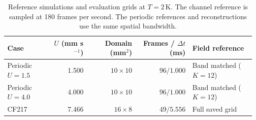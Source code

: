\begin{table}[tbp]
\centering
\caption{Reference simulations and evaluation grids at \(T=2\,\mathrm K\). The channel reference is sampled at 180 frames per second. The periodic references and reconstructions use the same spatial bandwidth.}
\label{tab:latest-simulation-reference}
\begin{tabular}{@{}lrrrl@{}}
\toprule
Case & $U$ (mm s$^{-1}$) & Domain (mm$^2$) & Frames / $\Delta t$ (ms) & Field reference \\
\midrule
Periodic $U=1.5$ & 1.500 & $10\times10$ & $96/1.000$ & Band matched ($K=12$) \\
Periodic $U=4.0$ & 4.000 & $10\times10$ & $96/1.000$ & Band matched ($K=12$) \\
CF217 & 7.466 & $16\times8$ & $49/5.556$ & Full saved grid \\
\bottomrule
\end{tabular}
\end{table}
